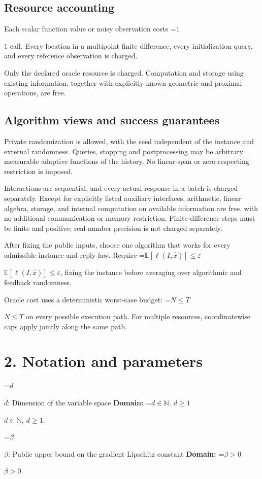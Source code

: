 \documentclass[10pt,a4paper]{article}
\newcommand{\AtlasMath}[1]{\par\begingroup\centering\setbox0=\hbox{$\displaystyle #1$}\ifdim\wd0>1.4\linewidth\typeout{ATLAS WIDE FORMULA: \the\wd0}\fi\ifdim\wd0>\linewidth\resizebox{\linewidth}{!}{\box0}\else\box0\fi\par\endgroup}
\newcommand{\AtlasInlineMath}[1]{\begingroup\setbox0=\hbox{$#1$}\ifdim\wd0>.4\linewidth\endgroup\AtlasMath{#1}\else\endgroup$#1$\fi}
\begin{document}
\subsection{Resource accounting}
Each scalar function value or noisy observation costs \AtlasInlineMath{1} call. Every location in a multipoint finite difference, every initialization query, and every reference observation is charged.

Only the declared oracle resource is charged. Computation and storage using existing information, together with explicitly known geometric and proximal operations, are free.

\subsection{Algorithm views and success guarantees}
Private randomization is allowed, with the seed independent of the instance and external randomness. Queries, stopping and postprocessing may be arbitrary measurable adaptive functions of the history. No linear-span or zero-respecting restriction is imposed.

Interactions are sequential, and every actual response in a batch is charged separately. Except for explicitly listed auxiliary interfaces, arithmetic, linear algebra, storage, and internal computation on available information are free, with no additional communication or memory restriction. Finite-difference steps must be finite and positive; real-number precision is not charged separately.

After fixing the public inputs, choose one algorithm that works for every admissible instance and reply law. Require \AtlasInlineMath{\mathbb{E}[\ell(I,\widehat{x})]\le \varepsilon}, fixing the instance before averaging over algorithmic and feedback randomness.

Oracle cost uses a deterministic worst-case budget: \AtlasInlineMath{N\le T} on every possible execution path. For multiple resources, coordinatewise caps apply jointly along the same path.

\section{2. Notation and parameters}
\AtlasInlineMath{d}: Dimension of the variable space \textbf{Domain:} \AtlasInlineMath{d\in\mathbb{N},\ d\ge1}.

\AtlasInlineMath{\beta}: Public upper bound on the gradient Lipschitz constant \textbf{Domain:} \AtlasInlineMath{\beta>0}.
\end{document}
